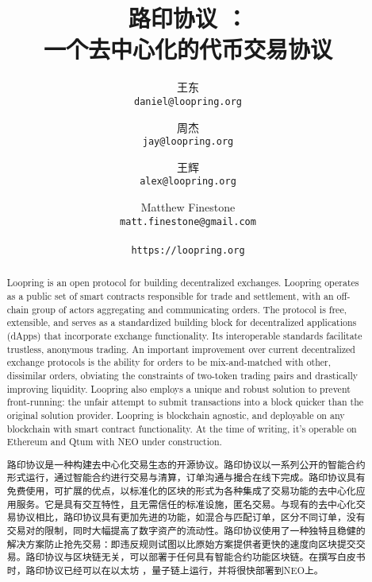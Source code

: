 \documentclass[UTF8,nofonts]{ctexart}
\title{\textbf{路印协议
：}\\\textbf{一个去中心化的代币交易协议}}
\author{
  王东\\
  \texttt{daniel@loopring.org}\\
  \and
  	周杰\\
  	\texttt{jay@loopring.org}\\
  	\and
  	王辉\\
  	\texttt{alex@loopring.org}\\
  	\and
  	Matthew Finestone\\
  	\texttt{matt.finestone@gmail.com}\\ 
  \\
  \texttt{https://loopring.org}
 }
\begin{document}
\maketitle


\begin{abstract}


Loopring is an open protocol for building decentralized exchanges. Loopring operates as a public set of smart contracts responsible for trade and settlement, with an off-chain group of actors aggregating and communicating orders. The protocol is free, extensible, and serves as a standardized building block for decentralized applications (dApps) that incorporate exchange functionality. Its interoperable standards facilitate trustless, anonymous trading. An important improvement over current decentralized exchange protocols is the ability for orders to be mix-and-matched with other, dissimilar orders, obviating the constraints of two-token trading pairs and drastically improving liquidity. Loopring also employs a unique and robust solution to prevent front-running: the unfair attempt to submit transactions into a block quicker than the original solution provider. Loopring is blockchain agnostic, and deployable on any blockchain with smart contract functionality. At the time of writing, it's operable on Ethereum \cite{wood2014ethereum} and Qtum  with NEO  under construction.

路印协议是一种构建去中心化交易生态的开源协议。路印协议以一系列公开的智能合约形式运行，通过智能合约进行交易与清算，订单沟通与撮合在线下完成。路印协议具有免费使用，可扩展的优点，以标准化的区块的形式为各种集成了交易功能的去中心化应用服务。它是具有交互特性，且无需信任的标准设施，匿名交易。与现有的去中心化交易协议相比，路印协议具有更加先进的功能，如混合与匹配订单，区分不同订单，没有交易对的限制，同时大幅提高了数字资产的流动性。路印协议使用了一种独特且稳健的解决方案防止抢先交易：即违反规则试图以比原始方案提供者更快的速度向区块提交交易。路印协议与区块链无关，可以部署于任何具有智能合约功能区块链。在撰写白皮书时，路印协议已经可以在以太坊\cite{buterin2017ethereum} ，量子链\cite{dai2017smart}上运行，并将很快部署到NEO\cite{atterlonn2018distributed}上。


\end{abstract}
\end{document}

